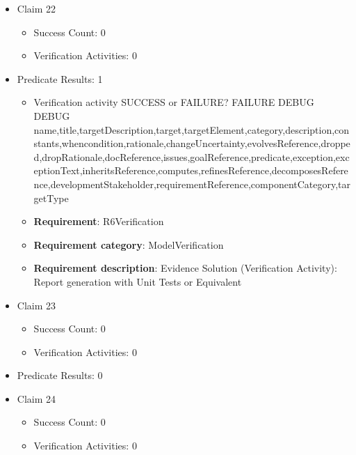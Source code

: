 \documentclass{article}
\begin{document}
\begin{itemize}
  				  \item Claim 22
				\begin{itemize}
			    	\item Success Count: 0 
			    	\item Verification Activities: 0
				\end{itemize}
				
									    
				\item Predicate Results: 1
					\begin{itemize}				
					\item Verification activity SUCCESS or FAILURE? FAILURE
					DEBUG DEBUG name,title,targetDescription,target,targetElement,category,description,constants,whencondition,rationale,changeUncertainty,evolvesReference,dropped,dropRationale,docReference,issues,goalReference,predicate,exception,exceptionText,inheritsReference,computes,refinesReference,decomposesReference,developmentStakeholder,requirementReference,componentCategory,targetType
					\item \textbf{Requirement}: R6Verification 
					\item \textbf{Requirement category}: ModelVerification
					\item \textbf{Requirement description}: Evidence Solution (Verification Activity): Report generation with Unit Tests or Equivalent
					\end{itemize}

  				  \item Claim 23
				\begin{itemize}
			    	\item Success Count: 0 
			    	\item Verification Activities: 0
				\end{itemize}
				
									    
				\item Predicate Results: 0

  				  \item Claim 24
				\begin{itemize}
			    	\item Success Count: 0 
			    	\item Verification Activities: 0
				\end{itemize}
				

\end{itemize}
\end{document}
